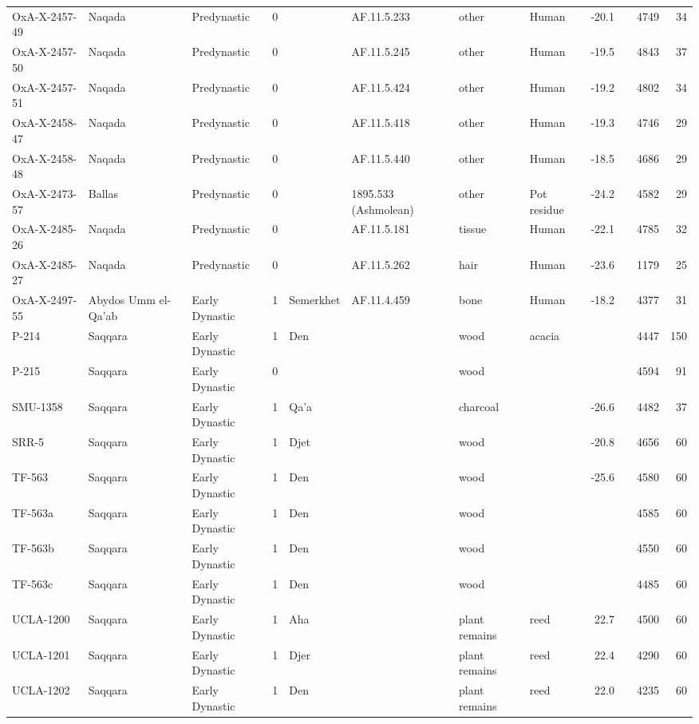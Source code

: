 \documentclass[a4paper,8pt]{article}
\begin{document}
\begin{landscape}
\begin{center}
\begin{longtable}{|l|>{\raggedright}p{20ex}|l|r|l|>{\raggedright}p{25ex}|l|l|r|l|r|r|}
OxA-X-2457-49 & Naqada & Predynastic & 0 &  & AF.11.5.233 & other & Human & -20.1 &  & 4749 & 34\\
OxA-X-2457-50 & Naqada & Predynastic & 0 &  & AF.11.5.245 & other & Human & -19.5 &  & 4843 & 37\\
OxA-X-2457-51 & Naqada & Predynastic & 0 &  & AF.11.5.424 & other & Human & -19.2 &  & 4802 & 34\\
OxA-X-2458-47 & Naqada & Predynastic & 0 &  & AF.11.5.418 & other & Human & -19.3 &  & 4746 & 29\\
OxA-X-2458-48 & Naqada & Predynastic & 0 &  & AF.11.5.440 & other & Human & -18.5 &  & 4686 & 29\\
OxA-X-2473-57 & Ballas & Predynastic & 0 &  & 1895.533 (Ashmolean) & other & Pot residue & -24.2 &  & 4582 & 29\\
OxA-X-2485-26 & Naqada & Predynastic & 0 &  & AF.11.5.181 & tissue & Human & -22.1 &  & 4785 & 32\\
OxA-X-2485-27 & Naqada & Predynastic & 0 &  & AF.11.5.262 & hair & Human & -23.6 &  & 1179 & 25\\
OxA-X-2497-55 & Abydos Umm el-Qa'ab & Early Dynastic & 1 & Semerkhet & AF.11.4.459 & bone & Human & -18.2 &  & 4377 & 31\\
P-214 & Saqqara & Early Dynastic & 1 & Den &  & wood & acacia &   &  & 4447 & 150\\
P-215 & Saqqara & Early Dynastic & 0 &  &  & wood &  &   &  & 4594 & 91\\
SMU-1358 & Saqqara & Early Dynastic & 1 & Qa'a &  & charcoal &  & -26.6 &  & 4482 & 37\\
SRR-5 & Saqqara & Early Dynastic & 1 & Djet &  & wood &  & -20.8 &  & 4656 & 60\\
TF-563 & Saqqara & Early Dynastic & 1 & Den &  & wood &  & -25.6 &  & 4580 & 60\\
TF-563a & Saqqara & Early Dynastic & 1 & Den &  & wood &  &   &  & 4585 & 60\\
TF-563b & Saqqara & Early Dynastic & 1 & Den &  & wood &  &   &  & 4550 & 60\\
TF-563c & Saqqara & Early Dynastic & 1 & Den &  & wood &  &   &  & 4485 & 60\\
UCLA-1200 & Saqqara & Early Dynastic & 1 & Aha &  & plant remains & reed & 22.7 &  & 4500 & 60\\
UCLA-1201 & Saqqara & Early Dynastic & 1 & Djer &  & plant remains & reed & 22.4 &  & 4290 & 60\\
UCLA-1202 & Saqqara & Early Dynastic & 1 & Den &  & plant remains & reed & 22.0 &  & 4235 & 60\\

\end{longtable}
\end{center}
\end{landscape}
\end{document}
